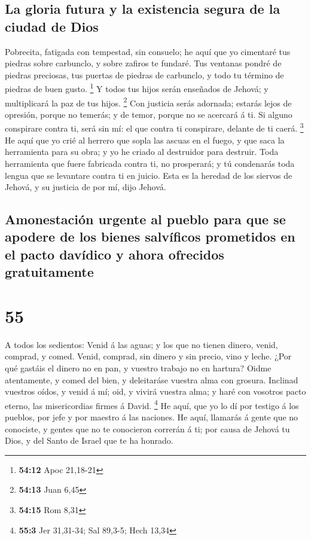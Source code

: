 \hypertarget{la-gloria-futura-y-la-existencia-segura-de-la-ciudad-de-dios}{%
\subsection{La gloria futura y la existencia segura de la ciudad de
Dios}\label{la-gloria-futura-y-la-existencia-segura-de-la-ciudad-de-dios}}

 Pobrecita, fatigada con tempestad, sin consuelo; he aquí
que yo cimentaré tus piedras sobre carbunclo, y sobre zafiros te
fundaré.  Tus ventanas pondré de piedras preciosas, tus
puertas de piedras de carbunclo, y todo tu término de piedras de buen
gusto. \footnote{\textbf{54:12} Apoc 21,18-21}  Y todos
tus hijos serán enseñados de Jehová; y multiplicará la paz de tus hijos.
\footnote{\textbf{54:13} Juan 6,45}  Con justicia serás
adornada; estarás lejos de opresión, porque no temerás; y de temor,
porque no se acercará á ti.  Si alguno conspirare contra
ti, será sin mí: el que contra ti conspirare, delante de ti caerá.
\footnote{\textbf{54:15} Rom 8,31}  He aquí que yo crié
al herrero que sopla las ascuas en el fuego, y que saca la herramienta
para su obra; y yo he criado al destruidor para destruir.
 Toda herramienta que fuere fabricada contra ti, no
prosperará; y tú condenarás toda lengua que se levantare contra ti en
juicio. Esta es la heredad de los siervos de Jehová, y su justicia de
por mí, dijo Jehová.

\hypertarget{amonestaciuxf3n-urgente-al-pueblo-para-que-se-apodere-de-los-bienes-salvuxedficos-prometidos-en-el-pacto-davuxeddico-y-ahora-ofrecidos-gratuitamente}{%
\subsection{Amonestación urgente al pueblo para que se apodere de los
bienes salvíficos prometidos en el pacto davídico y ahora ofrecidos
gratuitamente}\label{amonestaciuxf3n-urgente-al-pueblo-para-que-se-apodere-de-los-bienes-salvuxedficos-prometidos-en-el-pacto-davuxeddico-y-ahora-ofrecidos-gratuitamente}}

\hypertarget{section-54}{%
\section{55}\label{section-54}}

 A todos los sedientos: Venid á las aguas; y los que no
tienen dinero, venid, comprad, y comed. Venid, comprad, sin dinero y sin
precio, vino y leche.  ¿Por qué gastáis el dinero no en
pan, y vuestro trabajo no en hartura? Oidme atentamente, y comed del
bien, y deleitaráse vuestra alma con grosura.  Inclinad
vuestros oídos, y venid á mí; oid, y vivirá vuestra alma; y haré con
vosotros pacto eterno, las misericordias firmes á David. \footnote{\textbf{55:3}
  Jer 31,31-34; Sal 89,3-5; Hech 13,34}  He aquí, que yo
lo dí por testigo á los pueblos, por jefe y por maestro á las naciones.
 He aquí, llamarás á gente que no conociste, y gentes que
no te conocieron correrán á ti; por causa de Jehová tu Dios, y del Santo
de Israel que te ha honrado.

